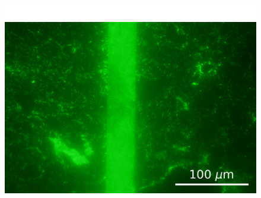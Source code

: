 \documentclass[
  a4paper,
]{scrbook}
\begin{document}
\begin{figure}
\begin{minipage}[t]{0.47\linewidth}
{{\includegraphics{figures/ch6/modified_GFPOR_PBASE_10sexposure_40X_mediumcontrast_ch6_231019.png}

}

}

\subcaption{\label{fig-PBASE-GFP-OR-ch6}}
\end{minipage}%
%
\begin{minipage}[t]{0.05\linewidth}

{\centering 

~

}

\end{minipage}%
%
\begin{minipage}[t]{0.47\linewidth}

{\centering 

}
\end{minipage}
\end{figure}
\end{document}
